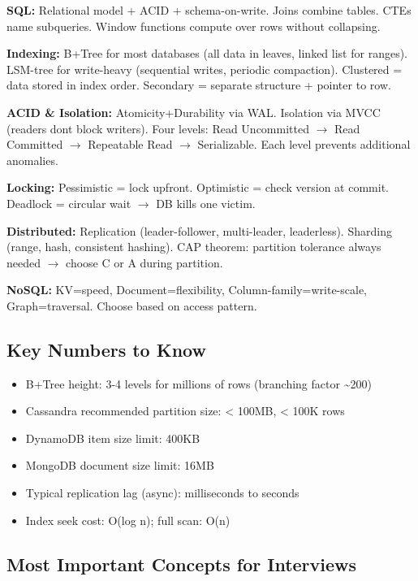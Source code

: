 \documentclass[11pt]{article}
\providecommand{\tightlist}{\setlength{\itemsep}{1pt}\setlength{\parskip}{0pt}}
\begin{document}
\textbf{SQL:} Relational model + ACID + schema-on-write. Joins combine tables. CTEs name subqueries. Window functions compute over rows without collapsing.

\textbf{Indexing:} B+Tree for most databases (all data in leaves, linked list for ranges). LSM-tree for write-heavy (sequential writes, periodic compaction). Clustered = data stored in index order. Secondary = separate structure + pointer to row.

\textbf{ACID \& Isolation:} Atomicity+Durability via WAL. Isolation via MVCC (readers don\textquotesingle t block writers). Four levels: Read Uncommitted \(\rightarrow\) Read Committed \(\rightarrow\) Repeatable Read \(\rightarrow\) Serializable. Each level prevents additional anomalies.

\textbf{Locking:} Pessimistic = lock upfront. Optimistic = check version at commit. Deadlock = circular wait \(\rightarrow\) DB kills one victim.

\textbf{Distributed:} Replication (leader-follower, multi-leader, leaderless). Sharding (range, hash, consistent hashing). CAP theorem: partition tolerance always needed \(\rightarrow\) choose C or A during partition.

\textbf{NoSQL:} KV=speed, Document=flexibility, Column-family=write-scale, Graph=traversal. Choose based on access pattern.

\subsection{Key Numbers to Know}\label{key-numbers-to-know}

\begin{itemize}
\tightlist
\item
  B+Tree height: 3-4 levels for millions of rows (branching factor \textasciitilde200)
\item
  Cassandra recommended partition size: \textless{} 100MB, \textless{} 100K rows
\item
  DynamoDB item size limit: 400KB
\item
  MongoDB document size limit: 16MB
\item
  Typical replication lag (async): milliseconds to seconds
\item
  Index seek cost: O(log n); full scan: O(n)
\end{itemize}

\subsection{Most Important Concepts for Interviews}\label{most-important-concepts-for-interviews}
\end{document}
